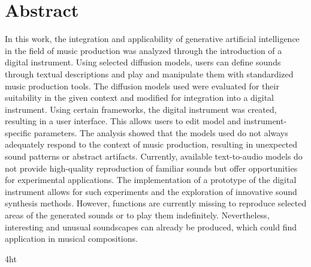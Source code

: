 \documentclass[
  a4paper,  %
  twoside,  %
  bibliography=totoc,
  headsepline,
  cleardoublepage=empty,
  parskip=half,
  draft=false
]{scrbook}
\begin{document}
\cleardoublepage

\section*{Abstract}

In this work, the integration and applicability of generative artificial intelligence in the field of music production was analyzed through the introduction of a digital instrument. Using selected diffusion models, users can define sounds through textual descriptions and play and manipulate them with standardized music production tools. The diffusion models used were evaluated for their suitability in the given context and modified for integration into a digital instrument. Using certain frameworks, the digital instrument was created, resulting in a user interface. This allows users to edit model and instrument-specific parameters. The analysis showed that the models used do not always adequately respond to the context of music production, resulting in unexpected sound patterns or abstract artifacts. Currently, available text-to-audio models do not provide high-quality reproduction of familiar sounds but offer opportunities for experimental applications. The implementation of a prototype of the digital instrument allows for such experiments and the exploration of innovative sound synthesis methods. However, functions are currently missing to reproduce selected areas of the generated sounds or to play them indefinitely. Nevertheless, interesting and unusual soundscapes can already be produced, which could find application in musical compositions.

\cleardoublepage



\iftex4ht
\else
\fi

%
%

%
%
%
\tableofcontents

\end{document}
